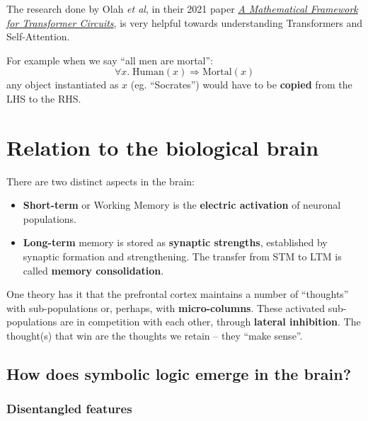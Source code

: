 \begin{preview}
The research done by Olah \textit{et al}, in their 2021 paper \textit{\uline{A Mathematical Framework for Transformer Circuits}}, is very helpful towards understanding Transformers and Self-Attention.  

For example when we say ``all men are mortal'':
\begin{equation}
\forall x. \; \mbox{Human}(x) \Rightarrow \mbox{Mortal}(x)
\end{equation}
any object instantiated as $x$ (eg. ``Socrates'') would have to be \textbf{copied} from the LHS to the RHS.

\section{Relation to the biological brain}

There are two distinct aspects in the brain:
\begin{itemize}
	\item \textbf{Short-term} or Working Memory is the \textbf{electric activation} of neuronal populations.
	\item \textbf{Long-term} memory is stored as \textbf{synaptic strengths}, established by synaptic formation and strengthening.  The transfer from STM to LTM is called \textbf{memory consolidation}.
\end{itemize}

One theory has it that the prefrontal cortex maintains a number of ``thoughts'' with sub-populations or, perhaps, with \textbf{micro-columns}.  These activated sub-populations are in competition with each other, through \textbf{lateral inhibition}.  The thought(s) that win are the thoughts we retain -- they ``make sense''.

\subsection{How does symbolic logic emerge in the brain?}

\subsubsection{Disentangled features}


\end{preview}
